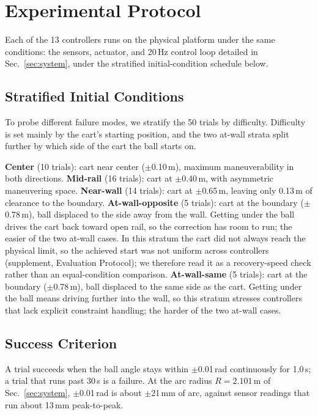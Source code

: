 \section{Experimental Protocol}
\label{sec:experiments}

Each of the 13 controllers runs on the physical platform under the same conditions: the sensors, actuator, and 20\,Hz control loop detailed in Sec.~\ref{sec:system}, under the stratified initial-condition schedule below.

\subsection{Stratified Initial Conditions}

To probe different failure modes, we stratify the 50 trials by difficulty.
Difficulty is set mainly by the cart's starting position, and the two at-wall strata split further by which side of the cart the ball starts on.

\noindent\textbf{Center} (10 trials): cart near center ($\pm$0.10\,m), maximum maneuverability in both directions.
\noindent\textbf{Mid-rail} (16 trials): cart at $\pm$0.40\,m, with asymmetric maneuvering space.
\noindent\textbf{Near-wall} (14 trials): cart at $\pm$0.65\,m, leaving only 0.13\,m of clearance to the boundary.
\noindent\textbf{At-wall-opposite} (5 trials): cart at the boundary ($\pm$0.78\,m), ball displaced to the side away from the wall.
Getting under the ball drives the cart back toward open rail, so the correction has room to run; the easier of the two at-wall cases.
In this stratum the cart did not always reach the physical limit, so the achieved start was not uniform across controllers (supplement, Evaluation Protocol); we therefore read it as a recovery-speed check rather than an equal-condition comparison.
\noindent\textbf{At-wall-same} (5 trials): cart at the boundary ($\pm$0.78\,m), ball displaced to the same side as the cart.
Getting under the ball means driving further into the wall, so this stratum stresses controllers that lack explicit constraint handling; the harder of the two at-wall cases.


\subsection{Success Criterion}

A trial succeeds when the ball angle stays within $\pm$0.01\,rad continuously for 1.0\,s; a trial that runs past 30\,s is a failure.
At the arc radius $R = 2.101$\,m of Sec.~\ref{sec:system}, $\pm$0.01\,rad is about $\pm$21\,mm of arc, against sensor readings that run about 13\,mm peak-to-peak.

